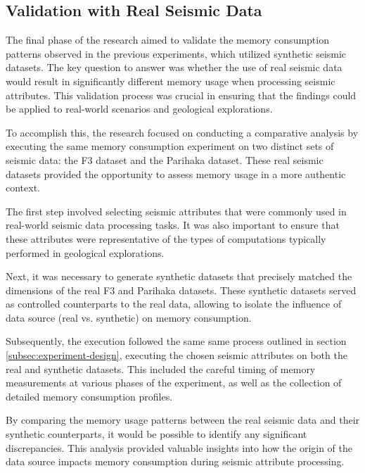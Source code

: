 \subsection{Validation with Real Seismic Data}

The final phase of the research aimed to validate the memory consumption patterns observed in the previous experiments, which utilized synthetic seismic datasets.
The key question to answer was whether the use of real seismic data would result in significantly different memory usage when processing seismic attributes.
This validation process was crucial in ensuring that the findings could be applied to real-world scenarios and geological explorations.

To accomplish this, the research focused on conducting a comparative analysis by executing the same memory consumption experiment on two distinct sets of seismic data: the F3 dataset and the Parihaka dataset.
These real seismic datasets provided the opportunity to assess memory usage in a more authentic context.

The first step involved selecting seismic attributes that were commonly used in real-world seismic data processing tasks.
It was also important to ensure that these attributes were representative of the types of computations typically performed in geological explorations.

Next, it was necessary to generate synthetic datasets that precisely matched the dimensions of the real F3 and Parihaka datasets.
These synthetic datasets served as controlled counterparts to the real data, allowing to isolate the influence of data source (real vs. synthetic) on memory consumption.

Subsequently, the execution followed the same same process outlined in section \ref{subsec:experiment-design}, executing the chosen seismic attributes on both the real and synthetic datasets.
This included the careful timing of memory measurements at various phases of the experiment, as well as the collection of detailed memory consumption profiles.

By comparing the memory usage patterns between the real seismic data and their synthetic counterparts, it would be possible to identify any significant discrepancies.
This analysis provided valuable insights into how the origin of the data source impacts memory consumption during seismic attribute processing.

